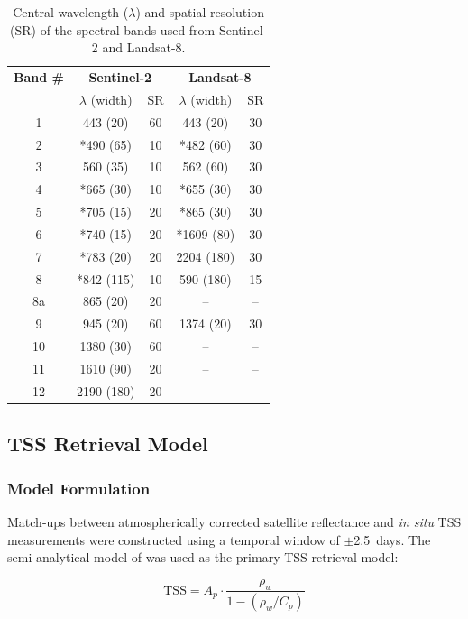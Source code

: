 \documentclass[remotesensing,article,submit,pdftex,moreauthors]{Definitions/mdpi}
\begin{document}
\begin{table}[h!]
\centering
\begin{tabular}{c|cc|cc}
\hline
\textbf{Band \#} & \multicolumn{2}{c|}{\textbf{Sentinel-2}} & 
\multicolumn{2}{c}{\textbf{Landsat-8}} \\
 & $\lambda$ (width) & SR & $\lambda$ (width) & SR \\
\hline
1 & 443 (20) & 60 & 443 (20) & 30 \\
2 & *490 (65) & 10 & *482 (60) & 30 \\
3 & 560 (35) & 10 & 562 (60) & 30 \\
4 & *665 (30) & 10 & *655 (30) & 30 \\
5 & *705 (15) & 20 & *865 (30) & 30 \\
6 & *740 (15) & 20 & *1609 (80) & 30 \\
7 & *783 (20) & 20 & 2204 (180) & 30 \\
8 & *842 (115) & 10 & 590 (180) & 15 \\
8a & 865 (20) & 20 & -- & -- \\
9 & 945 (20) & 60 & 1374 (20) & 30 \\
10 & 1380 (30) & 60 & -- & -- \\
11 & 1610 (90) & 20 & -- & -- \\
12 & 2190 (180) & 20 & -- & -- \\
\hline
\end{tabular}
\caption{Central wavelength ($\lambda$) and spatial resolution (SR) of the spectral bands used from Sentinel-2 and Landsat-8.}
\label{tab:spectral_bands}
\end{table}

\subsection{TSS Retrieval Model}
\label{sec:tss_models}
 
\subsubsection{Model Formulation}
 
Match-ups between atmospherically corrected satellite reflectance and
\textit{in situ} TSS measurements were constructed using a temporal
window of $\pm$2.5~days. The semi-analytical model of
\citet{NECHAD2010854} was used as the primary TSS retrieval model:
 
\begin{equation}
\text{TSS} = A_p \cdot \frac{\rho_w}{1 - (\rho_w / C_p)}
\label{eq:nechad}
\end{equation}
\end{document}
